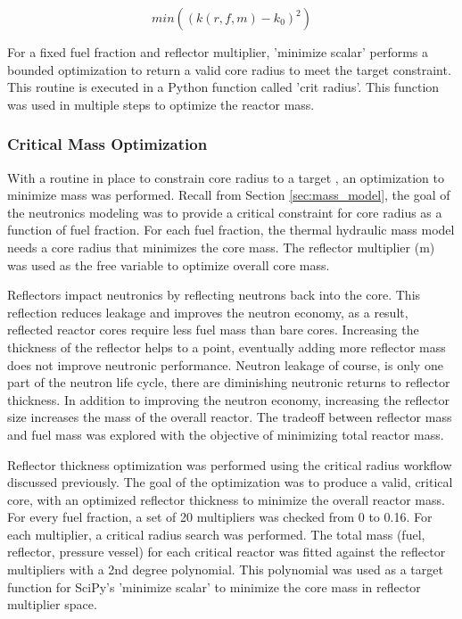 \begin{equation}
    min( (k(r, f, m) - k_0)^2 )
\end{equation}

For a fixed fuel fraction and reflector multiplier, 'minimize scalar' performs a
bounded optimization to return a valid core radius to meet the target \keff
constraint. This routine is executed in a Python function called 'crit radius'.
This function was used in multiple steps to optimize the reactor mass.

\subsubsection{Critical Mass Optimization}
With a routine in place to constrain core radius to a target \keff, an
optimization to minimize mass was performed. Recall from Section
\ref{sec:mass_model}, the goal of the neutronics modeling was to provide a
critical constraint for core radius as a function of fuel fraction. For each
fuel fraction, the thermal hydraulic mass model needs a core radius that
minimizes the core mass. The reflector multiplier (m) was used as the free
variable to optimize overall core mass. 

Reflectors impact neutronics by reflecting neutrons back into the core. This
reflection reduces leakage and improves the neutron economy, as a result,
reflected reactor cores require less fuel mass than bare cores. Increasing the
thickness of the reflector helps to a point, eventually adding more reflector
mass does not improve neutronic performance. Neutron leakage of course, is only
one part of the neutron life cycle, there are diminishing neutronic returns to
reflector thickness. In addition to improving the neutron economy, increasing
the reflector size increases the mass of the overall reactor. The tradeoff
between reflector mass and fuel mass was explored with the objective of
minimizing total reactor mass. 

Reflector thickness optimization was performed using the critical radius
workflow discussed previously. The goal of the optimization was to produce a
valid, critical core, with an optimized reflector thickness to minimize the
overall reactor mass. For every fuel fraction, a set of 20 multipliers was
checked from 0 to 0.16. For each multiplier, a critical radius search was
performed. The total mass (fuel, reflector, pressure vessel) for each critical
reactor was fitted against the reflector multipliers with a 2nd degree
polynomial. This polynomial was used as a target function for SciPy's
'minimize scalar' to minimize the core mass in reflector multiplier space.


